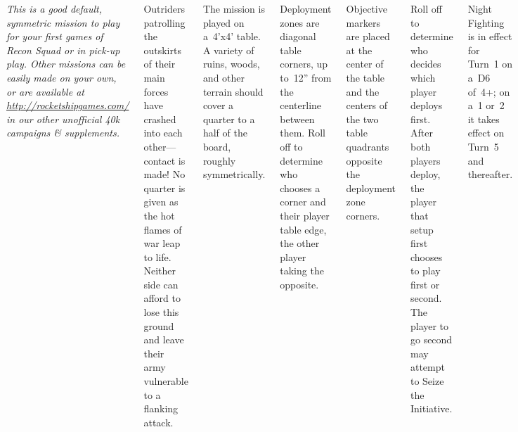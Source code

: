 
\begin{columns}

  \emph{This is a good default, symmetric mission to play for your
    first games of Recon Squad or in pick-up play.  Other missions can
    be easily made on your own, or are available at
    \url{http://rocketshipgames.com/} in our other unofficial 40k
    campaigns \& supplements.}
  
%

Outriders patrolling the outskirts of their main forces have crashed
into each other---contact is made!  No quarter is given as the hot
flames of war leap to life.  Neither side can afford to lose this
ground and leave their army vulnerable to a flanking attack.


%

The mission is played on a~4'x4' table.  A variety of ruins, woods,
and other terrain should cover a quarter to a half of the board,
roughly symmetrically.

Deployment zones are diagonal table corners, up to~12'' from the
centerline between them.  Roll off to determine who chooses a corner
and their player table edge, the other player taking the opposite.

Objective markers are placed at the center of the table and the
centers of the two table quadrants opposite the deployment zone
corners.

%

Roll off to determine who decides which player deploys first.  After
both players deploy, the player that setup first chooses to play first
or second.  The player to go second may attempt to Seize the
Initiative.

Night Fighting is in effect for Turn~1 on a~D6 of~4+; on a~1 or~2 it
takes effect on Turn~5 and thereafter.

The Variable Game Length rule applies.  At game end use the scoring
chart to determine the victor!


\columnbreak


\end{columns}
